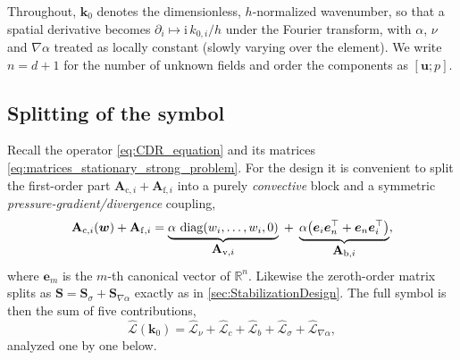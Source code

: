 Throughout, $\boldsymbol{k}_0$ denotes the dimensionless, $h$-normalized wavenumber, so that a spatial derivative becomes $\partial_i \mapsto \mathrm{i}\,k_{0,i}/h$ under the Fourier transform, with $\alpha$, $\nu$ and $\nabla\alpha$ treated as locally constant (slowly varying over the element). We write $n=d+1$ for the number of unknown fields and order the components as $[\boldsymbol{u};p]$.

\subsection{Splitting of the symbol}\label{sec:ftSplit}
Recall the operator \cref{eq:CDR_equation} and its matrices \cref{eq:matrices_stationary_strong_problem}. For the design it is convenient to split the first-order part $\mathbf{A}_{\mathrm{c},i}+\mathbf{A}_{\mathrm{f},i}$ into a purely \emph{convective} block and a symmetric \emph{pressure-gradient/divergence} coupling,
\begin{equation}\label{eq:ftSplit}
  \mathbf{A}_{\mathrm{c},i}(\boldsymbol{w}) + \mathbf{A}_{\mathrm{f},i}
   = \underbrace{\alpha\,\operatorname{diag}(w_i,\dots,w_i,0)}_{\textstyle \mathbf{A}_{\mathrm{v},i}}
   \; + \; \underbrace{\alpha\bigl(\boldsymbol{e}_i\boldsymbol{e}_{n}^{\top}+\boldsymbol{e}_{n}\boldsymbol{e}_i^{\top}\bigr)}_{\textstyle \mathbf{A}_{\mathrm{b},i}},
\end{equation}
where $\boldsymbol{e}_m$ is the $m$-th canonical vector of $\mathbb{R}^n$. Likewise the zeroth-order matrix splits as $\mathbf{S}=\mathbf{S}_\sigma+\mathbf{S}_{\nabla\alpha}$ exactly as in \cref{sec:StabilizationDesign}. The full symbol is then the sum of five contributions,
\begin{equation}\label{eq:ftSymbolSplit}
  \widehat{\mathcal{L}}(\boldsymbol{k}_0)
  = \widehat{\mathcal{L}}_{\nu} + \widehat{\mathcal{L}}_{c} + \widehat{\mathcal{L}}_{b}
  + \widehat{\mathcal{L}}_{\sigma} + \widehat{\mathcal{L}}_{\nabla\alpha},
\end{equation}
analyzed one by one below.

